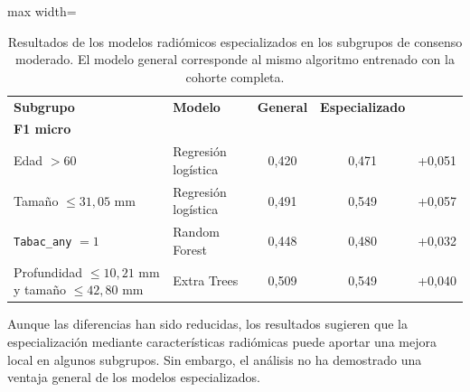 \begin{table}[!htbp]
\centering
\small
\setlength{\tabcolsep}{4pt}

\caption{Resultados de los modelos radiómicos especializados en los subgrupos de consenso moderado. El modelo general corresponde al mismo algoritmo entrenado con la cohorte completa.}
\label{tab:resultados_modelos_subgrupos}

\begin{adjustbox}{max width=\textwidth}
\begin{tabular}{llccc}
\toprule
\textbf{Subgrupo} &
\textbf{Modelo} &
\textbf{General} &
\textbf{Especializado} &
\shortstack{\(\boldsymbol{\Delta}\)\\\textbf{F1 micro}} \\
\midrule

Edad \(>60\) &
Regresión logística &
0,420 &
0,471 &
+0,051 \\

Tamaño \(\leq 31{,}05\) mm &
Regresión logística &
0,491 &
0,549 &
+0,057 \\

\texttt{Tabac\_any} \(=1\) &
Random Forest &
0,448 &
0,480 &
+0,032 \\

Profundidad \(\leq 10{,}21\) mm y tamaño \(\leq 42{,}80\) mm &
Extra Trees &
0,509 &
0,549 &
+0,040 \\

\bottomrule
\end{tabular}
\end{adjustbox}
\end{table}


Aunque las diferencias han sido reducidas, los resultados sugieren que la especialización mediante características radiómicas puede aportar una mejora local en algunos subgrupos. Sin embargo, el análisis no ha demostrado una ventaja general de los modelos especializados.



